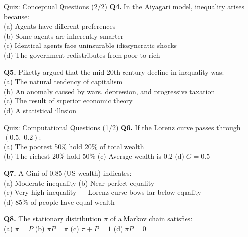\documentclass[aspectratio=169, 10pt]{beamer}
\begin{document}
\begin{frame}{Quiz: Conceptual Questions (2/2)}
\textbf{Q4.} In the Aiyagari model, inequality arises because: \\[3pt]
\quad (a) Agents have different preferences \\
\quad (b) Some agents are inherently smarter \\
\quad (c) \alert{Identical agents face uninsurable idiosyncratic shocks} \\
\quad (d) The government redistributes from poor to rich
\vspace{0.8em}

\textbf{Q5.} Piketty argued that the mid-20th-century decline in inequality was: \\[3pt]
\quad (a) The natural tendency of capitalism \\
\quad (b) \alert{An anomaly caused by wars, depression, and progressive taxation} \\
\quad (c) The result of superior economic theory \\
\quad (d) A statistical illusion
\end{frame}

\begin{frame}{Quiz: Computational Questions (1/2)}
\textbf{Q6.} If the Lorenz curve passes through $(0.5,\; 0.2)$: \\[3pt]
\quad (a) \alert{The poorest 50\% hold 20\% of total wealth} \\
\quad (b) The richest 20\% hold 50\% \quad
(c) Average wealth is 0.2 \quad
(d) $G = 0.5$
\vspace{0.8em}

\textbf{Q7.} A Gini of 0.85 (US wealth) indicates: \\[3pt]
\quad (a) Moderate inequality \quad
(b) Near-perfect equality \\
\quad (c) \alert{Very high inequality --- Lorenz curve bows far below equality} \\
\quad (d) 85\% of people have equal wealth
\vspace{0.8em}

\textbf{Q8.} The stationary distribution $\pi$ of a Markov chain satisfies: \\[3pt]
\quad (a) $\pi = P$ \quad
(b) \alert{$\pi P = \pi$} \quad
(c) $\pi + P = 1$ \quad
(d) $\pi P = 0$
\end{frame}
\end{document}
